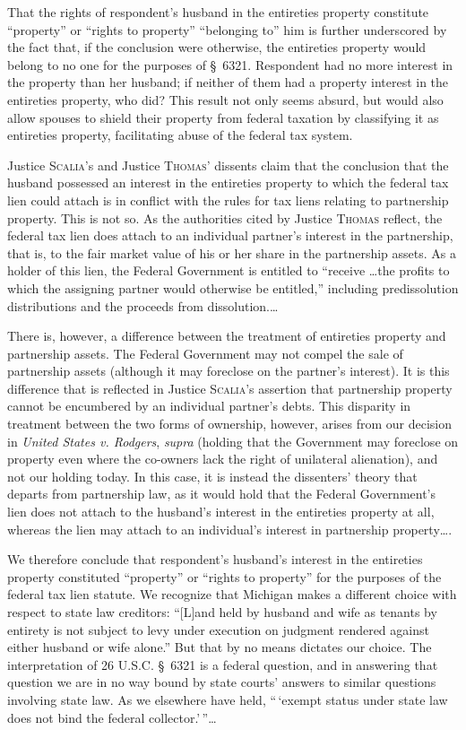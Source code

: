 That the rights of respondent's husband in the entireties property constitute
``property'' or ``rights to property'' ``belonging to'' him is further
underscored by the fact that, if the conclusion were otherwise, the entireties
property would belong to no one for the purposes of \S~6321. Respondent had
no more interest in the property than her husband; if neither of them had a
property interest in the entireties property, who did? This result not only
seems absurd, but would also allow spouses to shield their property from
federal taxation by classifying it as entireties property, facilitating abuse
of the federal tax system.

Justice \textsc{Scalia}'s and Justice \textsc{Thomas}' dissents claim that the
conclusion that the
husband possessed an interest in the entireties property to which the federal
tax lien could attach is in conflict with the rules for tax liens relating to
partnership property. This is not so. As the authorities cited by Justice
\textsc{Thomas} reflect, the federal tax lien does attach to an individual
partner's interest in the partnership, that is, to the fair market value of his
or her share in the partnership assets. As a holder of this lien, the Federal
Government is entitled to ``receive \dots the profits to which the assigning
partner would otherwise be entitled,'' including predissolution distributions
and the proceeds from dissolution.\ldots

There is, however, a difference between the treatment of entireties property and
partnership assets. The Federal Government may not compel the sale of
partnership assets (although it may foreclose on the partner's interest). It is
this difference that is reflected in Justice \textsc{Scalia}'s assertion that
partnership property cannot be encumbered by an individual partner's debts. This
disparity in treatment between the two forms of ownership, however, arises from
our decision in \emph{United States v. Rodgers}, \emph{supra} (holding that the
Government may foreclose on property even where the co-owners lack the right of
unilateral alienation), and not our holding today. In this case, it is instead
the dissenters' theory that departs from partnership law, as it would hold that
the Federal Government's lien does not attach to the husband's interest in the
entireties property at all, whereas the lien may attach to an individual's
interest in partnership property\dots.

We therefore conclude that respondent's husband's interest in the entireties
property constituted ``property'' or ``rights to property'' for the purposes of
the federal tax lien statute. We recognize that Michigan makes a different
choice with respect to state law creditors: ``[L]and held by husband and wife
as tenants by entirety is not subject to levy under execution on judgment
rendered against either husband or wife alone.'' But that by no means dictates
our choice. The interpretation of 26 U.S.C. \S~6321 is a federal question,
and in answering that question we are in no way bound by state courts' answers
to similar questions involving state law. As we elsewhere have held,
``\,`exempt status under state law does not bind the federal
collector.'\,''\dots

